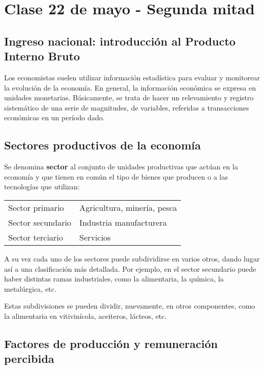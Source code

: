 \section{Clase 22 de mayo - Segunda mitad}

\subsection{Ingreso nacional: introducción al Producto Interno Bruto}

Los economistas suelen utilizar información estadística
para evaluar y monitorear la evolución de la economía.
En general, 
la información económica se expresa en unidades monetarias.
Básicamente,
se trata de hacer un relevamiento y registro sistemático 
de una serie de magnitudes, de variables,
referidas a transacciones económicas en un período dado.

\subsection{Sectores productivos de la economía}

Se denomina \textbf{sector} al conjunto de unidades productivas 
que actúan en la economía
y que tienen en común el tipo de bienes que producen 
o a las tecnologías que utilizan:

\vspace{.5cm}
\begin{table}[H]
    \centering
    \begin{tabular}{ll}
        \hline
        Sector primario   & Agricultura, minería, pesca \\
        Sector secundario & Industria manufacturera    \\
        Sector terciario  & Servicios                  \\
        \hline
    \end{tabular}
\end{table}
\vspace{.5cm}

A su vez cada uno de los sectores puede subdividirse en varios otros,
dando lugar así a una clasificación más detallada.
Por ejemplo,
en el sector secundario puede haber distintas ramas industriales,
como la alimentaria, la química, la metalúrgica, etc.

Estas subdivisiones se pueden dividir,
nuevamente,
en otros componentes,
como la alimentaria en vitivinícola, aceiteros, lácteos, etc.

\subsection{Factores de producción y remuneración percibida}

